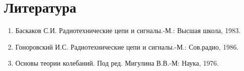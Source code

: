 \newpage
\section{Литература}
\begin{enumerate}
	\item Баскаков С.И. Радиотехнические цепи и сигналы.-М.: Высшая школа, 1983.
	\item Гоноровский И.С. Радиотехнические цепи и сигналы.-М.: Сов.радио, 1986.
	\item Основы теории колебаний. Под ред. Мигулина В.В.-М: Наука, 1976.
\end{enumerate}
